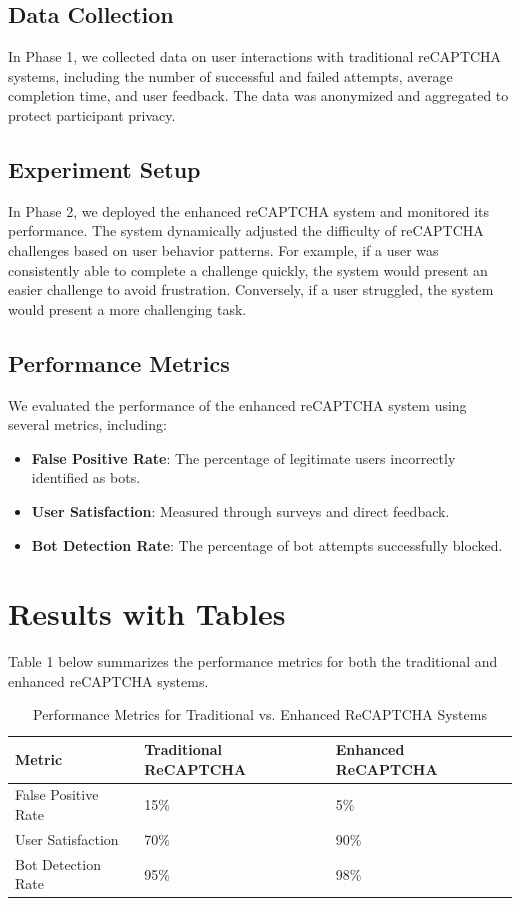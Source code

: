 \documentclass{article}
\begin{document}
\subsection{Data Collection}
In Phase 1, we collected data on user interactions with traditional reCAPTCHA systems, including the number of successful and failed attempts, average completion time, and user feedback. The data was anonymized and aggregated to protect participant privacy.

\subsection{Experiment Setup}
In Phase 2, we deployed the enhanced reCAPTCHA system and monitored its performance. The system dynamically adjusted the difficulty of reCAPTCHA challenges based on user behavior patterns. For example, if a user was consistently able to complete a challenge quickly, the system would present an easier challenge to avoid frustration. Conversely, if a user struggled, the system would present a more challenging task.

\subsection{Performance Metrics}
We evaluated the performance of the enhanced reCAPTCHA system using several metrics, including:
\begin{itemize}
    \item \textbf{False Positive Rate}: The percentage of legitimate users incorrectly identified as bots.
    \item \textbf{User Satisfaction}: Measured through surveys and direct feedback.
    \item \textbf{Bot Detection Rate}: The percentage of bot attempts successfully blocked.
\end{itemize}

\section{Results with Tables}
Table 1 below summarizes the performance metrics for both the traditional and enhanced reCAPTCHA systems.

\begin{table}[ht]
\centering
\begin{tabularx}{\textwidth}{|X|X|X|}
\hline
Metric & Traditional ReCAPTCHA & Enhanced ReCAPTCHA \\
\hline
False Positive Rate & 15\% & 5\% \\
User Satisfaction & 70\% & 90\% \\
Bot Detection Rate & 95\% & 98\% \\
\hline
\end{tabularx}
\caption{Performance Metrics for Traditional vs. Enhanced ReCAPTCHA Systems}
\label{tab:results}
\end{table}
\end{document}
